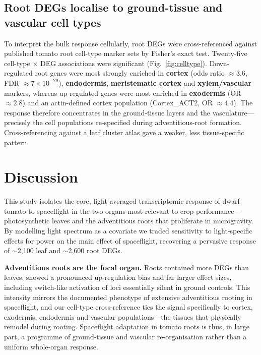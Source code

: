 \documentclass[10pt,twocolumn]{article}
\begin{document}
\subsection{Root DEGs localise to ground-tissue and vascular cell types}
To interpret the bulk response cellularly, root DEGs were cross-referenced against
published tomato root cell-type marker sets\cite{kajala2021} by Fisher's exact test.
Twenty-five cell-type $\times$ DEG associations were significant
(Fig.~\ref{fig:celltype}). Down-regulated root genes were most strongly enriched in
\textbf{cortex} (odds ratio $\approx 3.6$, FDR $\approx 7\times10^{-29}$),
\textbf{endodermis}, \textbf{meristematic cortex} and \textbf{xylem/vascular} markers,
whereas up-regulated genes were most enriched in \textbf{exodermis} (OR $\approx 2.8$)
and an actin-defined cortex population (Cortex\_ACT2, OR $\approx 4.4$). The response
therefore concentrates in the ground-tissue layers and the vasculature---precisely the
cell populations re-specified during adventitious-root formation. Cross-referencing
against a leaf cluster atlas gave a weaker, less tissue-specific pattern.

\section{Discussion}
This study isolates the core, light-averaged transcriptomic response of dwarf tomato
to spaceflight in the two organs most relevant to crop performance---photosynthetic
leaves and the adventitious roots that proliferate in microgravity. By modelling light
spectrum as a covariate we traded sensitivity to light-specific effects for power on
the main effect of spaceflight, recovering a pervasive response of $\sim$2,100 leaf
and $\sim$2,600 root DEGs.

\textbf{Adventitious roots are the focal organ.} Roots contained more DEGs than
leaves, showed a pronounced up-regulation bias and far larger effect sizes, including
switch-like activation of loci essentially silent in ground controls. This intensity
mirrors the documented phenotype of extensive adventitious rooting in spaceflight, and
our cell-type cross-reference ties the signal specifically to cortex, exodermis,
endodermis and vascular populations---the tissues that physically remodel during
rooting. Spaceflight adaptation in tomato roots is thus, in large part, a programme of
ground-tissue and vascular re-organisation rather than a uniform whole-organ response.
\end{document}
